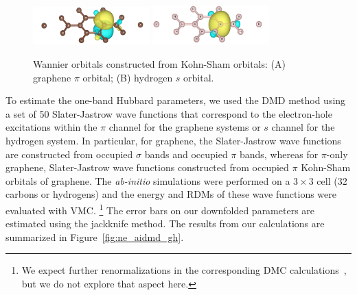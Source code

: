 \begin{figure}
\centering
\includegraphics[width=0.40\textwidth]{./Figures/c_pi.eps}
\includegraphics[width=0.40\textwidth]{./Figures/h_wan.eps}
\caption{Wannier orbitals constructed from Kohn-Sham orbitals: (A) graphene $\pi$ orbital; (B) hydrogen $s$ orbital. }
\label{fig:honeycomb_wan}
\end{figure}

To estimate the one-band Hubbard parameters, we used the DMD method using a set of 50 Slater-Jastrow wave functions that correspond 
to the electron-hole excitations within the $\pi$ channel for the graphene systems 
or $s$ channel for the hydrogen system. In particular, for graphene, 
the Slater-Jastrow wave functions are constructed from occupied $\sigma$ bands and occupied $\pi$ bands, whereas for $\pi$-only 
graphene, Slater-Jastrow wave functions constructed from occupied $\pi$ Kohn-Sham orbitals of graphene. The \textit{ab-initio} simulations 
were performed on a $3\times3$ cell (32 carbons or hydrogens) and the energy and RDMs of these wave functions were
evaluated with VMC. \footnote{We expect further renormalizations in the corresponding DMC calculations~\cite{Changlani2015}, 
but we do not explore that aspect here. } The error bars on our downfolded parameters are estimated using the jackknife method. 
The results from our calculations are summarized in %
Figure~\ref{fig:ne_aidmd_gh}.%


